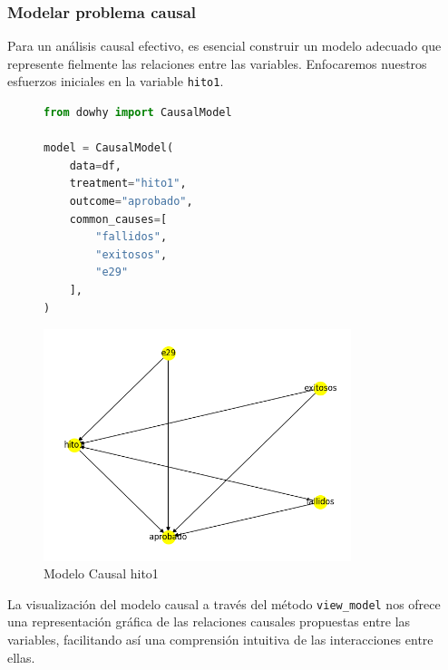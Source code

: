 \subsubsection{Modelar problema causal}

Para un análisis causal efectivo, es esencial construir un modelo adecuado que represente fielmente las relaciones entre las variables. Enfocaremos nuestros esfuerzos iniciales en la variable \texttt{hito1}.

\begin{figure}[H]
    \centering
    \begin{minipage}{0.48\textwidth}
        \begin{lstlisting}[language=Python, caption=Modelo causal hito1, label=lst:model_causalHito1]
from dowhy import CausalModel

model = CausalModel(
    data=df,
    treatment="hito1",
    outcome="aprobado",
    common_causes=[
        "fallidos",
        "exitosos",
        "e29"
    ],
)
        \end{lstlisting}
    \end{minipage}
    \hfill
    \begin{minipage}{0.48\textwidth}
        \centering
        \includegraphics[width=0.8\textwidth]{img/causalidad/graph_causal_model_hito1.png}
        \caption{Modelo Causal hito1}
        \label{fig:modelo_causal_hito1}
    \end{minipage}
\end{figure}

La visualización del modelo causal a través del método \texttt{view\_model} nos ofrece una representación gráfica de las relaciones causales propuestas entre las variables, facilitando así una comprensión intuitiva de las interacciones entre ellas.


